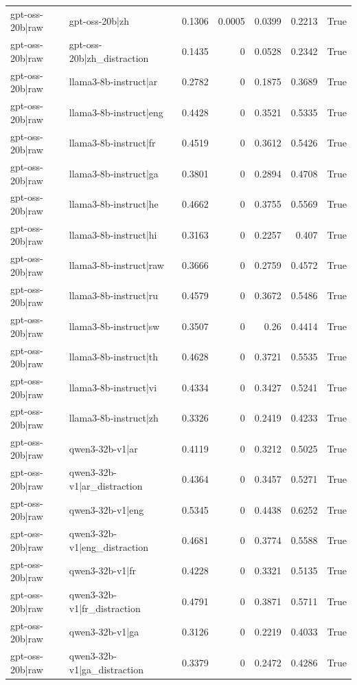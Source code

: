 \begin{table}
\begin{tabular}{l l r r r r l}
gpt-oss-20b|raw & gpt-oss-20b|zh & 0.1306 & 0.0005 & 0.0399 & 0.2213 & True \\
gpt-oss-20b|raw & gpt-oss-20b|zh_distraction & 0.1435 & 0 & 0.0528 & 0.2342 & True \\
gpt-oss-20b|raw & llama3-8b-instruct|ar & 0.2782 & 0 & 0.1875 & 0.3689 & True \\
gpt-oss-20b|raw & llama3-8b-instruct|eng & 0.4428 & 0 & 0.3521 & 0.5335 & True \\
gpt-oss-20b|raw & llama3-8b-instruct|fr & 0.4519 & 0 & 0.3612 & 0.5426 & True \\
gpt-oss-20b|raw & llama3-8b-instruct|ga & 0.3801 & 0 & 0.2894 & 0.4708 & True \\
gpt-oss-20b|raw & llama3-8b-instruct|he & 0.4662 & 0 & 0.3755 & 0.5569 & True \\
gpt-oss-20b|raw & llama3-8b-instruct|hi & 0.3163 & 0 & 0.2257 & 0.407 & True \\
gpt-oss-20b|raw & llama3-8b-instruct|raw & 0.3666 & 0 & 0.2759 & 0.4572 & True \\
gpt-oss-20b|raw & llama3-8b-instruct|ru & 0.4579 & 0 & 0.3672 & 0.5486 & True \\
gpt-oss-20b|raw & llama3-8b-instruct|sw & 0.3507 & 0 & 0.26 & 0.4414 & True \\
gpt-oss-20b|raw & llama3-8b-instruct|th & 0.4628 & 0 & 0.3721 & 0.5535 & True \\
gpt-oss-20b|raw & llama3-8b-instruct|vi & 0.4334 & 0 & 0.3427 & 0.5241 & True \\
gpt-oss-20b|raw & llama3-8b-instruct|zh & 0.3326 & 0 & 0.2419 & 0.4233 & True \\
gpt-oss-20b|raw & qwen3-32b-v1|ar & 0.4119 & 0 & 0.3212 & 0.5025 & True \\
gpt-oss-20b|raw & qwen3-32b-v1|ar_distraction & 0.4364 & 0 & 0.3457 & 0.5271 & True \\
gpt-oss-20b|raw & qwen3-32b-v1|eng & 0.5345 & 0 & 0.4438 & 0.6252 & True \\
gpt-oss-20b|raw & qwen3-32b-v1|eng_distraction & 0.4681 & 0 & 0.3774 & 0.5588 & True \\
gpt-oss-20b|raw & qwen3-32b-v1|fr & 0.4228 & 0 & 0.3321 & 0.5135 & True \\
gpt-oss-20b|raw & qwen3-32b-v1|fr_distraction & 0.4791 & 0 & 0.3871 & 0.5711 & True \\
gpt-oss-20b|raw & qwen3-32b-v1|ga & 0.3126 & 0 & 0.2219 & 0.4033 & True \\
gpt-oss-20b|raw & qwen3-32b-v1|ga_distraction & 0.3379 & 0 & 0.2472 & 0.4286 & True \\

\end{tabular}
\end{table}
